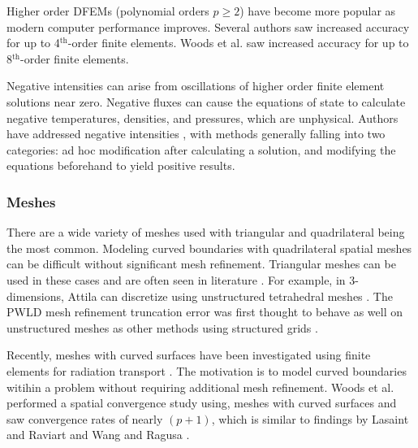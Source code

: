 \documentclass{article}
\begin{document}
Higher order DFEMs (polynomial orders $p \geq 2$) have become more popular as modern computer performance improves. Several authors \cite{WangRagusaDSA, WangHODGTransport, WangDGFEMConvergence, WangDissertation} saw increased accuracy for up to 4$^\text{th}$-order finite elements. Woods et al. \cite{WoodsHoDgfemXyCurved} saw increased accuracy for up to 8$^\text{th}$-order finite elements.

Negative intensities can arise from oscillations of higher order finite element solutions near zero. Negative fluxes can cause the equations of state to calculate negative temperatures, densities, and pressures, which are unphysical. Authors have addressed negative intensities \cite{HamiltonNegativeFluxFixups, Adams_Disc_FEM_Thick_Diff, MaginotNonNegative, MaginotLumpingDFEM, BrunnerPreservingPositivity}, with methods generally falling into two categories: ad hoc modification after calculating a solution, and modifying the equations beforehand to yield positive results.



\subsubsection{Meshes}

There are a wide variety of meshes used with triangular and quadrilateral being the most common. Modeling curved boundaries with quadrilateral spatial meshes can be difficult without significant mesh refinement. Triangular meshes can be used in these cases and are often seen in literature \cite{ReedTriangularMesh, WangHODGTransport, WangDGFEMConvergence, MorelLLDrz}. For example, in 3-dimensions, Attila can discretize using unstructured tetrahedral meshes \cite{WareingAttila}. The PWLD mesh refinement truncation error was first thought to behave as well on unstructured meshes as other methods using structured grids \cite{StonePLFEM}.

Recently, meshes with curved surfaces have been investigated using finite elements for radiation transport \cite{WoodsHoDgfemXyCurved, WoodsThesis}. The motivation is to model curved boundaries witihin a problem without requiring additional mesh refinement. Woods et al. \cite{WoodsHoDgfemXyCurved} performed a spatial convergence study using, meshes with curved surfaces and saw convergence rates of nearly $(p+1)$, which is similar to findings by Lasaint and Raviart \cite{LasaintFEM} and Wang and Ragusa \cite{WangHODGTransport}.
\end{document}

